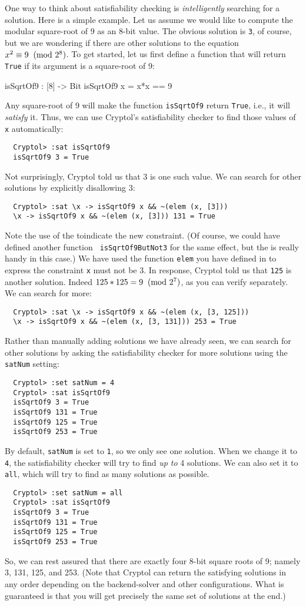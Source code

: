 One way to think about satisfiability checking is \emph{intelligently}
searching for a solution. Here is a simple example. Let us assume we
would like to compute the modular square-root of 9 as an 8-bit
value. The obvious solution is {\tt 3}, of course, but we are
wondering if there are other solutions to the equation $x^2 \equiv 9
\imod{2^8}$. To get started, let us first define a function that will
return {\tt True} if its argument is a square-root of 9:
\begin{code}
  isSqrtOf9 : [8] -> Bit
  isSqrtOf9 x = x*x == 9
\end{code}
Any square-root of 9 will make the function {\tt isSqrtOf9} return
{\tt True}, i.e., it will \emph{satisfy} it.  Thus, we can use
Cryptol's satisfiability checker to find those values of {\tt x}
automatically:
\begin{Verbatim}
  Cryptol> :sat isSqrtOf9 
  isSqrtOf9 3 = True
\end{Verbatim}
Not surprisingly, Cryptol told us that 3 is one such value. We can
search for other solutions by explicitly disallowing 3:
\begin{Verbatim}
  Cryptol> :sat \x -> isSqrtOf9 x && ~(elem (x, [3]))
  \x -> isSqrtOf9 x && ~(elem (x, [3])) 131 = True
\end{Verbatim}
Note the use of the \lamex to\indLamExp indicate the new
constraint. (Of course, we could have defined another function {\tt
  isSqrtOf9ButNot3} for the same effect, but the \lamex is really
handy in this case.) We have used the function {\tt elem} you have
defined in \indElem to
express the constraint {\tt x} must not be 3. In response, Cryptol
told us that {\tt 125} is another solution. Indeed $125 * 125 =
9\imod{2^7}$, as you can verify separately.  We can search for more:
\begin{Verbatim}
  Cryptol> :sat \x -> isSqrtOf9 x && ~(elem (x, [3, 125]))
  \x -> isSqrtOf9 x && ~(elem (x, [3, 131])) 253 = True
\end{Verbatim}
Rather than manually adding solutions we have already seen, we can
search for other solutions by asking the satisfiability checker for
more solutions using the {\tt satNum} setting:
\begin{Verbatim}
  Cryptol> :set satNum = 4
  Cryptol> :sat isSqrtOf9
  isSqrtOf9 3 = True
  isSqrtOf9 131 = True
  isSqrtOf9 125 = True
  isSqrtOf9 253 = True
\end{Verbatim}
By default, {\tt satNum} is set to {\tt 1}, so we only see one
solution. When we change it to {\tt 4}, the satisfiability checker
will try to find \emph{up to} 4 solutions. We can also set it to {\tt
  all}, which will try to find as many solutions as possible.
\begin{Verbatim}
  Cryptol> :set satNum = all
  Cryptol> :sat isSqrtOf9
  isSqrtOf9 3 = True
  isSqrtOf9 131 = True
  isSqrtOf9 125 = True
  isSqrtOf9 253 = True
\end{Verbatim}
So, we can rest assured that there are exactly four 8-bit square roots
of 9; namely 3, 131, 125, and 253. (Note that Cryptol can return the
satisfying solutions in any order depending on the backend-solver and
other configurations. What is guaranteed is that you will get
precisely the same set of solutions at the end.)

